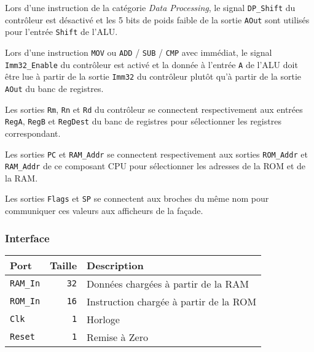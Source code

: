 \documentclass{article}
\begin{document}
    Lors d'une instruction de la catégorie \textit{Data Processing}, le signal \texttt{DP\_Shift} du contrôleur est désactivé et les 5 bits de poids faible de la sortie \texttt{AOut} sont utilisés pour l'entrée \texttt{Shift} de l'ALU.

    Lors d'une instruction \texttt{MOV} ou \texttt{ADD} / \texttt{SUB} / \texttt{CMP} avec immédiat, le signal \texttt{Imm32\_Enable} du contrôleur est activé
    et la donnée à l'entrée \texttt{A} de l'ALU doit être lue à partir de la sortie \texttt{Imm32} du contrôleur plutôt qu'à partir de la sortie \texttt{AOut} du banc de registres.

    Les sorties \texttt{Rm}, \texttt{Rn} et \texttt{Rd} du contrôleur se connectent respectivement aux entrées \texttt{RegA}, \texttt{RegB} et \texttt{RegDest} du banc de registres pour sélectionner les registres correspondant.

    Les sorties \texttt{PC} et \texttt{RAM\_Addr} se connectent respectivement aux sorties \texttt{ROM\_Addr} et \texttt{RAM\_Addr} de ce composant CPU pour sélectionner les adresses de la ROM et de la RAM.
    
    Les sorties \texttt{Flags} et \texttt{SP} se connectent aux broches du même nom pour communiquer ces valeurs aux afficheurs de la façade.

    \subsubsection{Interface}


    \begin{tabular}{|l|r|l|}
        \hline
        \textbf{Port}   & \textbf{Taille} & \textbf{Description}                   \\
        \hline

        \texttt{RAM\_In} & \texttt{32}     & Données chargées à partir de la RAM    \\
        \hline
        \texttt{ROM\_In} & \texttt{16}     & Instruction chargée à partir de la ROM \\
        \hline
        \texttt{Clk}    & \texttt{1}      & Horloge                                \\
        \hline
        \texttt{Reset}  & \texttt{1}      & Remise à Zero                          \\


        \hline
    \end{tabular}
\end{document}
